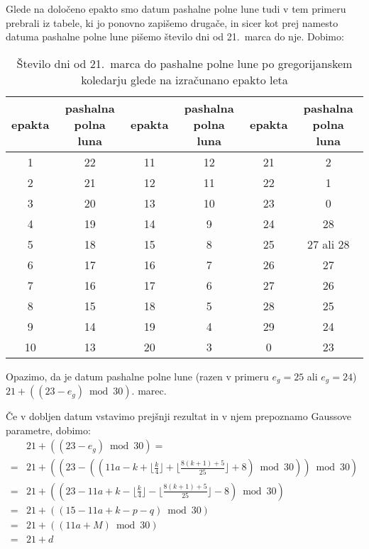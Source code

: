 \documentclass[a4paper,12pt]{article}
\begin{document}
Glede na določeno epakto smo datum pashalne polne lune tudi v tem primeru prebrali 
iz tabele, ki jo ponovno zapišemo drugače, in sicer kot prej namesto datuma pashalne
polne lune pišemo število dni od 21.\ marca do nje. Dobimo:

\begin{table}
    \centering
    \caption{Število dni od 21.\ marca do pashalne polne lune po gregorijanskem koledarju glede na izračunano epakto leta}
    \label{gregorijanski-tm}
    \begin{tabular}{| c c | c c | c c |}
        \hline
        epakta & \makecell{pashalna \\ polna luna} & epakta & \makecell{pashalna \\ polna luna} & epakta & \makecell{pashalna \\ polna luna} \\ \hline
        1 & 22 & 11 & 12 & 21 & 2 \\  
        2 & 21 & 12 & 11 & 22 & 1 \\
        3 & 20 & 13 & 10 & 23 & 0 \\
        4 & 19 & 14 & 9 & 24 & 28 \\
        5 & 18 & 15 & 8 & 25 & 27 ali 28 \\
        6 & 17 & 16 & 7 & 26 & 27 \\
        7 & 16 & 17 & 6 & 27 & 26 \\
        8 & 15 & 18 & 5 & 28 & 25 \\
        9 & 14 & 19 & 4 & 29 & 24 \\
        10 & 13 & 20 & 3 & 0 & 23 \\ \hline
    \end{tabular}
\end{table}

Opazimo, da je datum pashalne polne lune (razen v primeru 
$e_g = 25$ ali $e_g = 24$) $21 + ((23 - e_g) \bmod 30)$. marec.

Če v dobljen datum vstavimo prejšnji rezultat in v njem prepoznamo Gaussove parametre,
dobimo: 
\begin{align*}
    &21 + ((23 - e_g) \bmod 30) = \\
    = &21 + ((23 - ((11a - k + \lfloor \frac{k}{4} \rfloor + \lfloor \frac{8 (k + 1) + 5}{25} \rfloor + 8) \bmod 30)) \bmod 30) \\
    = &21 + ((23 - 11a + k - \lfloor \frac{k}{4} \rfloor - \lfloor \frac{8 (k + 1) + 5}{25} \rfloor - 8) \bmod 30) \\
    = &21 + ((15 - 11a + k - p - q) \bmod 30) \\
    = &21 + ((11a + M) \bmod 30) \\
    = &21 + d
\end{align*}
\end{document}
